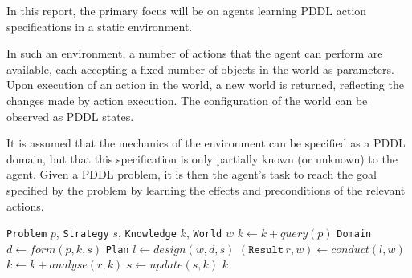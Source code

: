 \documentclass[master.tex]{subfiles}
\begin{document}
In this report, the primary focus will be on agents learning PDDL action specifications in a static environment.

In such an environment, a number of actions that the agent can perform are available, each accepting a fixed number of objects in the world as parameters. Upon execution of an action in the world, a new world is returned, reflecting the changes made by action execution. The configuration of the world can be observed as PDDL states.

It is assumed that the mechanics of the environment can be specified as a PDDL domain, but that this specification is only partially known (or unknown) to the agent. Given a PDDL problem, it is then the agent's task to reach the goal specified by the problem by learning the effects and preconditions of the relevant actions.

\begin{algorithm}
    \caption{}
    \label{algo:PDDL}

    \begin{algorithmic}
         {\texttt{Problem} $p$, \texttt{Strategy} $s$, \texttt{Knowledge} $k$, \texttt{World} $w$}
                \State $k \gets k + query(p)$
                \State \texttt{Domain} $d \gets form(p, k, s)$
                \State \texttt{Plan} $l \gets design(w, d, s)$
                \State $(\texttt{Result} \, r, w) \gets conduct(l, w)$
                \State $k \gets k + analyse(r, k)$
                \State $s \gets update(s, k)$
            \EndWhile
            \State \Return $k$
        \EndFunction
    \end{algorithmic}
\end{algorithm}
\end{document}
